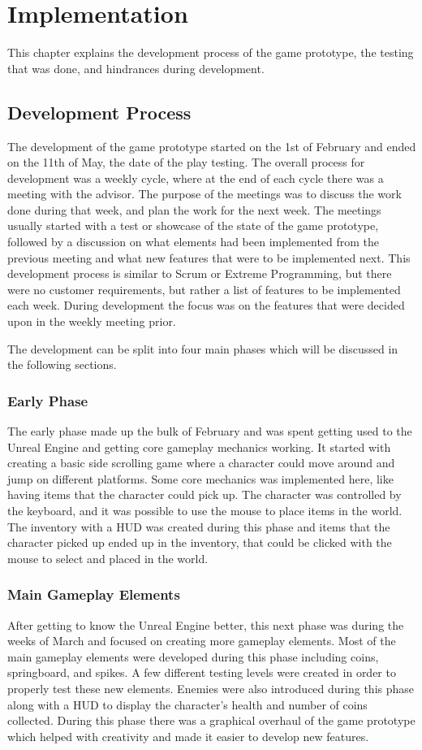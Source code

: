 \chapter{Implementation}
This chapter explains the development process of the game prototype, the testing that was done, and hindrances during development.


\section{Development Process}
The development of the game prototype started on the 1st of February and ended on the 11th of May, the date of the play testing. The overall process for development was a weekly cycle, where at the end of each cycle there was a meeting with the advisor. The purpose of the meetings was to discuss the work done during that week, and plan the work for the next week. The meetings usually started with a test or showcase of the state of the game prototype, followed by a discussion on what elements had been implemented from the previous meeting and what new features that were to be implemented next. This development process is similar to Scrum or Extreme Programming, but there were no customer requirements, but rather a list of features to be implemented each week. During development the focus was on the features that were decided upon in the weekly meeting prior.

The development can be split into four main phases which will be discussed in the following sections.

\subsection{Early Phase}
The early phase made up the bulk of February and was spent getting used to the Unreal Engine and getting core gameplay mechanics working. It started with creating a basic side scrolling game where a character could move around and jump on different platforms. Some core mechanics was implemented here, like having items that the character could pick up. The character was controlled by the keyboard, and it was possible to use the mouse to place items in the world. The inventory with a HUD was created during this phase and items that the character picked up ended up in the inventory, that could be clicked with the mouse to select and placed in the world. 

\subsection{Main Gameplay Elements}
After getting to know the Unreal Engine better, this next phase was during the weeks of March and focused on creating more gameplay elements. Most of the main gameplay elements were developed during this phase including coins, springboard, and spikes. A few different testing levels were created in order to properly test these new elements. Enemies were also introduced during this phase along with a HUD to display the character's health and number of coins collected. During this phase there was a graphical overhaul of the game prototype which helped with creativity and made it easier to develop new features.

